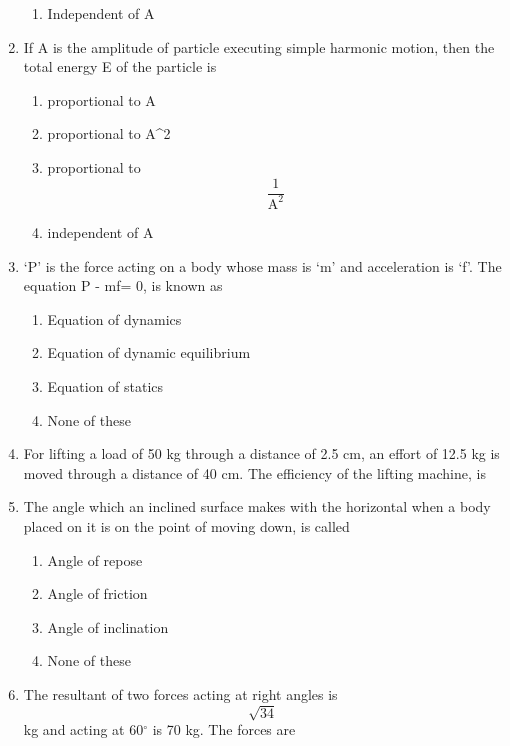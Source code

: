 \documentclass[11pt,a4paper]{article}
\begin{document}
\begin{enumerate}
\begin{enumerate}[label=\Alph*.]
\item{Independent of A}
\end{enumerate}
\item{If A is the amplitude of particle executing simple harmonic motion, then the total energy E of the particle is}
\begin{enumerate}[label=\Alph*.]
\item{proportional to A}
\item{proportional to A\^{}2}
\item{proportional to $$\frac{1}{{{{\text{A}}^2}}}$$}
\item{independent of A}
\end{enumerate}
\item{`P' is the force acting on a body whose mass is `m' and acceleration is `f'. The equation P - mf= 0, is known as
}
\begin{enumerate}[label=\Alph*.]
\item{Equation of dynamics}
\item{Equation of dynamic equilibrium}
\item{Equation of statics}
\item{None of these}
\end{enumerate}
\item{For lifting a load of 50 kg through a distance of 2.5 cm, an effort of 12.5 kg is moved through a distance of 40 cm. The efficiency of the lifting machine, is}
\\
\item{The angle which an inclined surface makes with the horizontal when a body placed on it is on the point of moving down, is called}
\begin{enumerate}[label=\Alph*.]
\item{Angle of repose}
\item{Angle of friction}
\item{Angle of inclination}
\item{None of these}
\end{enumerate}
\item{The resultant of two forces acting at right angles is $$\sqrt {34} \,$$ kg and acting at 60$^\circ$ is 70 kg. The forces are
}
\end{enumerate}
\end{document}
